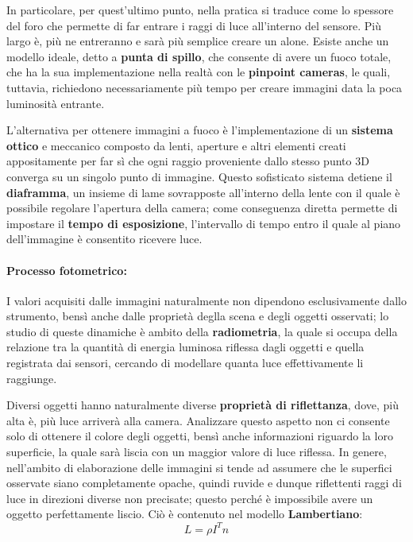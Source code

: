 \noindent In particolare, per quest'ultimo punto, nella pratica si traduce come lo spessore del foro che permette di far entrare i raggi di luce
all'interno del sensore. Più largo è, più ne entreranno e sarà più semplice creare un alone. Esiste anche un modello ideale, detto a \textbf{punta di
spillo}, che consente di avere un fuoco totale, che ha la sua implementazione nella realtà con le \textbf{pinpoint cameras}, le quali, tuttavia,
richiedono necessariamente più tempo per creare immagini data la poca luminosità entrante.\par
L'alternativa per ottenere immagini a fuoco è l'implementazione di un \textbf{sistema ottico} e meccanico composto da lenti, aperture e altri elementi
creati appositamente per far sì che ogni raggio proveniente dallo stesso punto 3D converga su un singolo punto di immagine. Questo sofisticato sistema
detiene il \textbf{diaframma}, un insieme di lame sovrapposte all'interno della lente con il quale è possibile regolare l'apertura della camera; come
conseguenza diretta permette di impostare il \textbf{tempo di esposizione}, l'intervallo di tempo entro il quale al piano dell'immagine è consentito
ricevere luce.

\paragraph{Processo fotometrico:} I valori acquisiti dalle immagini naturalmente non dipendono esclusivamente dallo strumento, bensì anche dalle
proprietà deglla scena e degli oggetti osservati; lo studio di queste dinamiche è ambito della \textbf{radiometria}, la quale si occupa della relazione
tra la quantità di energia luminosa riflessa dagli oggetti e quella registrata dai sensori, cercando di modellare quanta luce effettivamente li
raggiunge.\par
Diversi oggetti hanno naturalmente diverse \textbf{proprietà di riflettanza}, dove, più alta è, più luce arriverà alla camera. Analizzare questo aspetto
non ci consente solo di ottenere il colore degli oggetti, bensì anche informazioni riguardo la loro superficie, la quale sarà liscia con un maggior
valore di luce riflessa. In genere, nell'ambito di elaborazione delle immagini si tende ad assumere che le superfici osservate siano completamente
opache, quindi ruvide e dunque riflettenti raggi di luce in direzioni diverse non precisate; questo perché è impossibile avere un oggetto perfettamente
liscio. Ciò è contenuto nel modello \textbf{Lambertiano}: \[
	L = \rho I^Tn
\]

